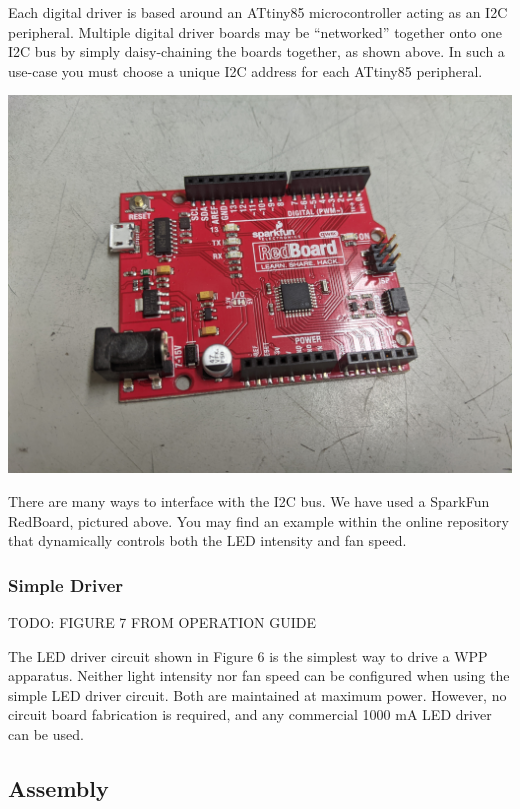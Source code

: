 \documentclass[11pt]{article}
\begin{document}
Each digital driver is based around an ATtiny85 microcontroller acting as an I2C peripheral.
Multiple digital driver boards may be ``networked'' together onto one I2C bus by simply daisy-chaining the boards together, as shown above.
In such a use-case you must choose a unique I2C address for each ATtiny85 peripheral.

\begin{center}
  \includegraphics[width=\textwidth/2]{"./redboard.jpg"}
\end{center}

There are many ways to interface with the I2C bus.
We have used a SparkFun RedBoard, pictured above.
You may find an example within the online repository that dynamically controls both the LED intensity and fan speed.



\subsubsection{Simple Driver} \label{SEC:simple-driver}

TODO: FIGURE 7 FROM OPERATION GUIDE

The LED driver circuit shown in Figure 6 is the simplest way to drive a WPP apparatus.
Neither light intensity nor fan speed can be configured when using the simple LED driver circuit.
Both are maintained at maximum power.
However, no circuit board fabrication is required, and any commercial 1000 mA LED driver can be used.

\subsection{Assembly} \label{SEC:assembly}
\end{document}
